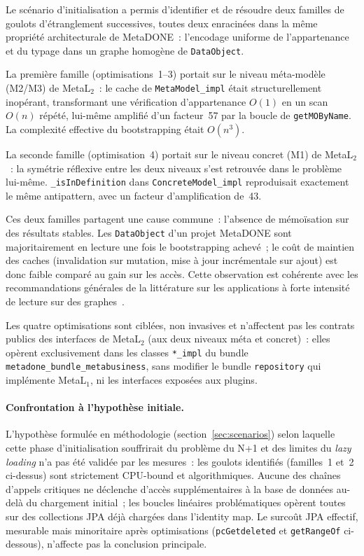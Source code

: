 Le scénario d'initialisation a permis d'identifier et de résoudre deux
familles de goulots d'étranglement successives, toutes deux enracinées
dans la même propriété architecturale de MetaDONE~: l'encodage uniforme
de l'appartenance et du typage dans un graphe homogène de
\texttt{DataObject}.

La première famille (optimisations~1--3) portait sur le niveau
méta-modèle (M2/M3) de MetaL$_2$~: le cache de \texttt{MetaModel\_impl}
était structurellement inopérant, transformant une vérification
d'appartenance $O(1)$ en un scan $O(n)$ répété, lui-même amplifié d'un
facteur~57 par la boucle de \texttt{getMOByName}. La complexité
effective du bootstrapping était $O(n^3)$.

La seconde famille (optimisation~4) portait sur le niveau concret
(M1) de MetaL$_2$~: la symétrie réflexive entre les deux niveaux
s'est retrouvée dans le problème lui-même.
\texttt{\_isInDefinition} dans \texttt{ConcreteModel\_impl}
reproduisait exactement le même antipattern, avec un facteur
d'amplification de~43.

Ces deux familles partagent une cause commune~: l'absence de mémoïsation
sur des résultats stables. Les \texttt{DataObject} d'un projet MetaDONE
sont majoritairement en lecture une fois le bootstrapping achevé~; le
coût de maintien des caches (invalidation sur mutation, mise à jour
incrémentale sur ajout) est donc faible comparé au gain sur les accès.
Cette observation est cohérente avec les recommandations générales de la
littérature sur les applications à forte intensité de lecture sur des
graphes~\cite{oaks2014java, fowler2002patterns}.

Les quatre optimisations sont ciblées, non invasives et n'affectent
pas les contrats publics des interfaces de MetaL$_2$ (aux deux
niveaux méta et concret)~: elles opèrent exclusivement dans les
classes \texttt{*\_impl} du bundle \texttt{metadone\_bundle\_metabusiness},
sans modifier le bundle \texttt{repository} qui implémente MetaL$_1$,
ni les interfaces exposées aux plugins.

\paragraph{Confrontation à l'hypothèse initiale.}
L'hypothèse formulée en méthodologie (section~\ref{sec:scenarios})
selon laquelle cette phase d'initialisation souffrirait du problème
du N+1 et des limites du \emph{lazy loading} n'a pas été validée par
les mesures~: les goulots identifiés (familles~1 et~2 ci-dessus) sont
strictement CPU-bound et algorithmiques. Aucune des chaînes d'appels
critiques ne déclenche d'accès supplémentaires à la base de données
au-delà du chargement initial~; les boucles linéaires problématiques
opèrent toutes sur des collections JPA déjà chargées dans l'identity
map. Le surcoût JPA effectif, mesurable mais minoritaire après
optimisations (\texttt{pcGetdeleted} et \texttt{getRangeOf} ci-dessous),
n'affecte pas la conclusion principale.

